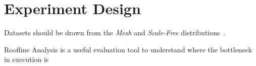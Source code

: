 \section{Experiment Design}
\label{section:33-GHA-Design}

Datasets should be drawn from the \textit{Mesh} and \textit{Scale-Free} distributions~\cite{Beamer2015}.

Roofline Analysis is a useful evaluation tool to understand where the bottleneck in execution is~\cite{Williams2009,Hennessy2019}